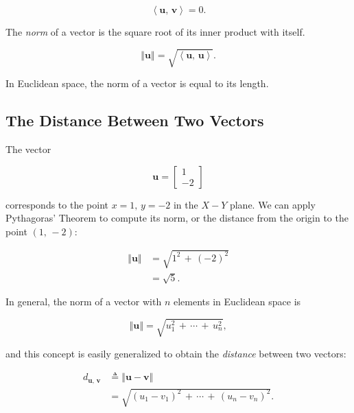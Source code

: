 \documentclass[graybox,envcountchap,sectrefs]{svmono}\usepackage[]{graphicx}\usepackage[]{xcolor}
\begin{document}
\begin{appendices}
\begin{equation}
\left\langle \mathrm{\mathbf{u}},\,\mathrm{\mathbf{v}}\right\rangle =0.\label{eq:OrthogonalVectors}
\end{equation}

The \emph{norm} of a vector is the square root of its inner product
with itself.

\begin{equation}
\left\Vert \mathrm{\mathbf{u}}\right\Vert =\sqrt{\left\langle \mathrm{\mathbf{u}},\,\mathrm{\mathbf{u}}\right\rangle }.\label{eq:NormU}
\end{equation}

In Euclidean space, the norm of a vector is equal to its length.

\subsection{The Distance Between Two Vectors}

The vector

\begin{equation}
\mathrm{\mathbf{u}}=\left[\begin{array}{r}
1\\
-2
\end{array}\right]\label{eq:VectorWith2Elements}
\end{equation}

corresponds to the point $x=1,\,y=-2$ in the $X-Y$ plane. We can
apply Pythagoras' Theorem to compute its norm, or the distance from
the origin to the point $\left(1,\,-2\right)$:

\begin{align}
\left\Vert \mathrm{\mathbf{u}}\right\Vert  & =\sqrt{1^{2}\,+\,\left(-2\right)^{2}}\nonumber \\
 & =\sqrt{5}.\label{eq:LengthOfVectorWith2Elements}
\end{align}

In general, the norm of a vector with $n$ elements in Euclidean space
is

\begin{equation}
\left\Vert \mathrm{\mathbf{u}}\right\Vert =\sqrt{u_{1}^{2}\,+\,\cdots\,+\,u_{n}^{2}},\label{eq:LengthOfVector}
\end{equation}

and this concept is easily generalized to obtain the \emph{distance}
between two vectors:

\begin{align}
d_{\mathrm{\mathbf{u}},\,\mathrm{\mathbf{v}}} & \triangleq\left\Vert \mathrm{\mathbf{u}}-\mathrm{\mathbf{v}}\right\Vert \nonumber \\
 & =\sqrt{\left(u_{1}-v_{1}\right)^{2}\,+\,\cdots\,+\,\left(u_{n}-v_{n}\right)^{2}}.\label{eq:DistanceBetweenVectors}
\end{align}


\end{appendices}
\end{document}
